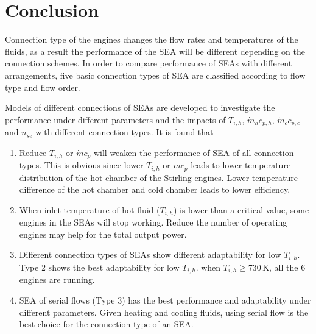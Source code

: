 \section{Conclusion}

Connection type of the engines changes the flow rates and temperatures of the fluids, as a result the performance of the SEA will be different depending on the connection schemes. In order to compare performance of SEAs with different arrangements, five basic connection types of SEA are classified according to flow type and flow order. 


Models of different connections of SEAs are developed to investigate the performance under different parameters and the impacts of $T_{i,h}$, $\dot{m}_hc_{p,h}$, $\dot{m}_cc_{p,c}$ and $n_{se}$ with different connection types. It is found that

\begin{enumerate}[label=(\arabic*)]
\item Reduce $T_{i,h}$ or $\dot{m}c_{p}$ will weaken the performance of SEA of all connection types. This is obvious since lower $T_{i,h}$ or $\dot{m}c_p$ leads to lower temperature distribution of the hot chamber of the Stirling engines. Lower temperature difference of the hot chamber and cold chamber leads to lower efficiency.
\item When inlet temperature of hot fluid ($T_{i,h}$) is lower than a critical value, some engines in the SEAs will stop working. Reduce the number of operating engines may help for the total output power.
\item Different connection types of SEAs show different adaptability for low $T_{i,h}$. Type 2 shows the best adaptability for low $T_{i,h}$. when $T_{i,h} \geqslant 730\,\mathrm{K}$, all the 6 engines are running.
\item SEA of serial flows (Type 3) has the best performance and adaptability under different parameters. Given heating and cooling fluids, using serial flow is the best choice for the connection type of an SEA.
	
\end{enumerate}